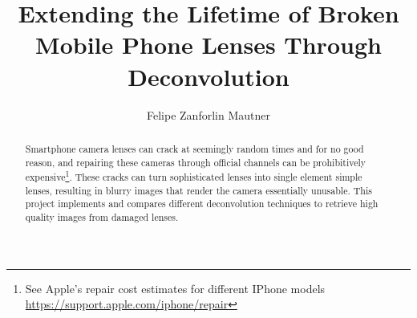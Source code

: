\documentclass[sigconf]{acmart}
\begin{document}
\setlength{\footskip}{0.2in}  %
\pagestyle{plain}



\title{Extending the Lifetime of Broken Mobile Phone Lenses Through Deconvolution}


\author{Felipe Zanforlin Mautner}



\renewcommand{\shortauthors}{Felipe Mautner}

\begin{abstract}
Smartphone camera lenses can crack at seemingly random times and for no good reason, and repairing these cameras through official channels can be prohibitively expensive\footnote{See Apple's repair cost estimates for different IPhone models \url{https://support.apple.com/iphone/repair}}. These cracks can turn sophisticated lenses into single element simple lenses, resulting in blurry images that render the camera essentially unusable. This project implements and compares different deconvolution techniques to retrieve high quality images from damaged lenses.

\end{abstract}
\end{document}
